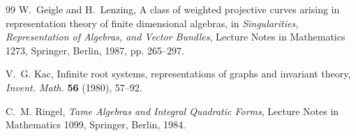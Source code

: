 \documentclass[11pt,a4paper]{article}
\theoremstyle{definition}
\theoremstyle{plain}
\begin{document}
\begin{thebibliography}{99}
W.~Geigle and H.~Lenzing, A class of weighted projective curves arising in representation theory of finite dimensional algebras, in \emph{Singularities, Representation of Algebras, and Vector Bundles}, Lecture Notes in Mathematics 1273, Springer, Berlin, 1987, pp. 265--297.

V.~G. Kac, Infinite root systems, representations of graphs and invariant theory, \emph{Invent. Math.} \textbf{56} (1980), 57--92.

C.~M. Ringel, \emph{Tame Algebras and Integral Quadratic Forms}, Lecture Notes in Mathematics 1099, Springer, Berlin, 1984.

\end{thebibliography}
\end{document}
